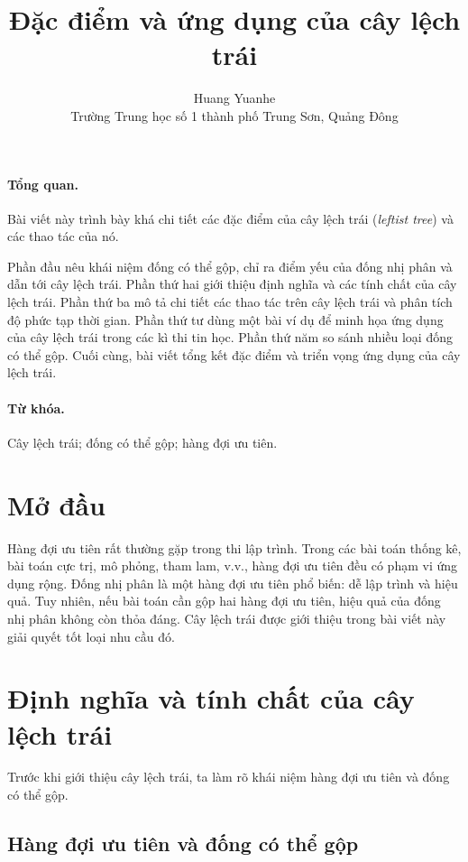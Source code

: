 \documentclass[11pt]{article}
\title{Đặc điểm và ứng dụng của cây lệch trái}
\author{Huang Yuanhe\\Trường Trung học số 1 thành phố Trung Sơn, Quảng Đông}
\date{}
\begin{document}
\maketitle

\paragraph{Tổng quan.}
Bài viết này trình bày khá chi tiết các đặc điểm của cây lệch trái
(\emph{leftist tree}) và các thao tác của nó.

Phần đầu nêu khái niệm đống có thể gộp, chỉ ra điểm yếu của đống nhị phân và
dẫn tới cây lệch trái. Phần thứ hai giới thiệu định nghĩa và các tính chất của
cây lệch trái. Phần thứ ba mô tả chi tiết các thao tác trên cây lệch trái và
phân tích độ phức tạp thời gian. Phần thứ tư dùng một bài ví dụ để minh họa
ứng dụng của cây lệch trái trong các kì thi tin học. Phần thứ năm so sánh nhiều
loại đống có thể gộp. Cuối cùng, bài viết tổng kết đặc điểm và triển vọng ứng
dụng của cây lệch trái.

\paragraph{Từ khóa.}
Cây lệch trái; đống có thể gộp; hàng đợi ưu tiên.

\section{Mở đầu}

Hàng đợi ưu tiên rất thường gặp trong thi lập trình. Trong các bài toán thống
kê, bài toán cực trị, mô phỏng, tham lam, v.v., hàng đợi ưu tiên đều có phạm vi
ứng dụng rộng. Đống nhị phân là một hàng đợi ưu tiên phổ biến: dễ lập trình và
hiệu quả. Tuy nhiên, nếu bài toán cần gộp hai hàng đợi ưu tiên, hiệu quả của
đống nhị phân không còn thỏa đáng. Cây lệch trái được giới thiệu trong bài viết
này giải quyết tốt loại nhu cầu đó.

\section{Định nghĩa và tính chất của cây lệch trái}

Trước khi giới thiệu cây lệch trái, ta làm rõ khái niệm hàng đợi ưu tiên và
đống có thể gộp.

\subsection{Hàng đợi ưu tiên và đống có thể gộp}
\end{document}
